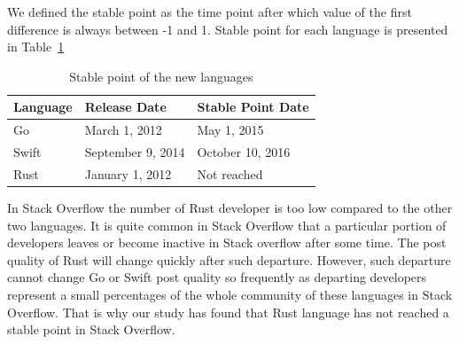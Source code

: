 We defined the stable point as the time point after which value of the first difference is always between -1 and 1. Stable point for each language is presented in Table~\ref{table:Stable point}

\begin{table}[htbp]
\centering
\caption{Stable point of the new languages}
\begin{tabular}{|l|l|l|}
\hline
Language & Release Date & Stable Point Date  \\ \hline
Go & March 1, 2012 & May 1, 2015\\ \hline
Swift & September 9, 2014 & October 10, 2016\\ \hline
Rust & January 1, 2012 & Not reached \\ \hline
\end{tabular}
\label{table:Stable point}
\end{table}

In Stack Overflow the number of Rust developer is too low compared to the other two languages. It is quite common in Stack Overflow that a particular portion of developers leaves or become inactive in  Stack overflow after some time. The post quality of Rust will change quickly after such departure. However, such departure cannot change Go or Swift post quality so frequently as departing developers represent a small percentages of the whole community of these languages in Stack Overflow. That is why our study has found that Rust language has not reached a stable point in Stack Overflow.



